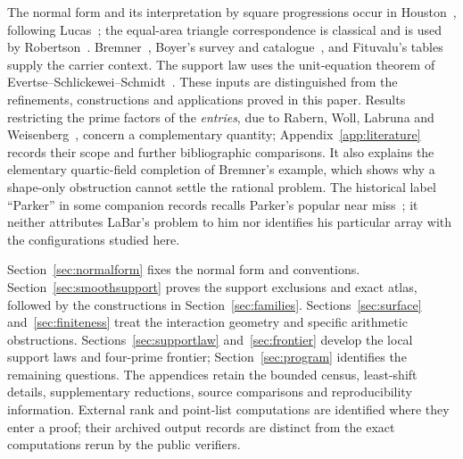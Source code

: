 The normal form and its interpretation by square progressions occur in
Houston~\cite{HOU16A,HOU16B}, following Lucas~\cite{LUC76,LUC91}; the
equal-area triangle correspondence is classical and is used by
Robertson~\cite{ROB96}. Bremner~\cite{BRE99,BRE01}, Boyer's
survey and catalogue~\cite{BOY05,BOYWEB}, and Fituvalu's
tables~\cite{FIT} supply the carrier context. The support law uses the
unit-equation theorem of Evertse--Schlickewei--Schmidt~\cite{ESS02}.
These inputs are distinguished from the refinements, constructions and
applications proved in this paper. Results restricting the prime factors
of the \emph{entries}, due to Rabern, Woll, Labruna and
Weisenberg~\cite{RAB03,WOL18,LAB18,WEI23}, concern a complementary
quantity; Appendix~\ref{app:literature} records their scope and further
bibliographic comparisons. It also explains the elementary quartic-field
completion of Bremner's example, which shows why a shape-only obstruction
cannot settle the rational problem. The historical label ``Parker'' in
some companion records recalls Parker's popular near miss~\cite{PARKER};
it neither attributes LaBar's problem to him nor identifies his particular
array with the configurations studied here.

Section~\ref{sec:normalform} fixes the normal form and conventions.
Section~\ref{sec:smoothsupport} proves the support exclusions and exact
atlas, followed by the constructions in Section~\ref{sec:families}.
Sections~\ref{sec:surface} and~\ref{sec:finiteness} treat the interaction
geometry and specific arithmetic obstructions.
Sections~\ref{sec:supportlaw} and~\ref{sec:frontier} develop the local
support laws and four-prime frontier; Section~\ref{sec:program} identifies
the remaining questions. The appendices retain the bounded census,
least-shift details, supplementary reductions, source comparisons and
reproducibility information. External rank and point-list computations
are identified where they enter a proof; their archived output records
are distinct from the exact computations rerun by the public verifiers.
